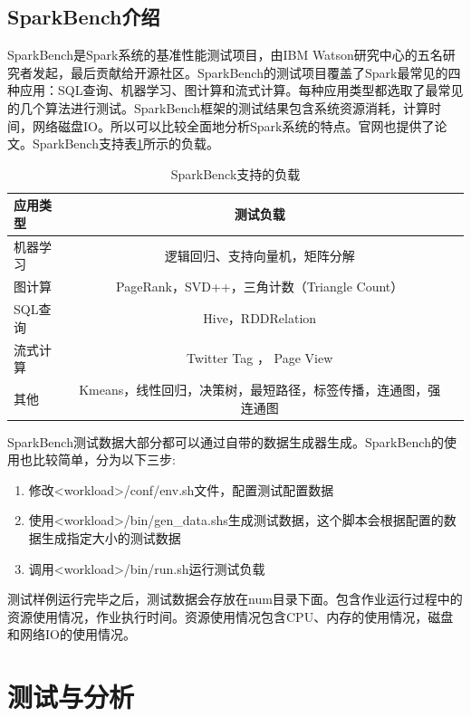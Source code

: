 \subsection{SparkBench介绍}

SparkBench是Spark系统的基准性能测试项目，由IBM Watson研究中心的五名研究者发起，最后贡献给开源社区。SparkBench的测试项目覆盖了Spark最常见的四种应用：SQL查询、机器学习、图计算和流式计算。每种应用类型都选取了最常见的几个算法进行测试。SparkBench框架的测试结果包含系统资源消耗，计算时间，网络磁盘IO。所以可以比较全面地分析Spark系统的特点。官网也提供了论文。SparkBench支持表\ref{tab:workload}所示的负载。

\begin{table}
 \centering
 \caption{SparkBenck支持的负载}
 \label{tab:workload}
 \begin{tabular}{lcl}
  \toprule
  应用类型 & 测试负载 \\
  \midrule
  机器学习 & 逻辑回归、支持向量机，矩阵分解  \\
  图计算 &  PageRank，SVD++，三角计数（Triangle Count） \\
  SQL查询 & Hive，RDDRelation  \\
  流式计算 & Twitter Tag ， Page View  \\
  其他 &  Kmeans，线性回归，决策树，最短路径，标签传播，连通图，强连通图 \\
  \bottomrule
 \end{tabular}
\end{table}

SparkBench测试数据大部分都可以通过自带的数据生成器生成。SparkBench的使用也比较简单，分为以下三步:

\begin{enumerate}
    \item 修改<workload>/conf/env.sh文件，配置测试配置数据
    \item 使用<workload>/bin/gen\_data.shs生成测试数据，这个脚本会根据配置的数据生成指定大小的测试数据
    \item 调用<workload>/bin/run.sh运行测试负载
\end{enumerate}

测试样例运行完毕之后，测试数据会存放在num目录下面。包含作业运行过程中的资源使用情况，作业执行时间。资源使用情况包含CPU、内存的使用情况，磁盘和网络IO的使用情况。

\section{测试与分析}

